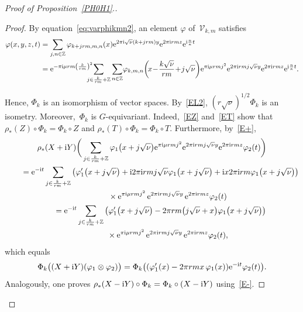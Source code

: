 \documentclass[10pt,a4paper]{amsart}
\newcommand\Z{{\mathbb Z}}
\newcommand\cV{{\mathcal V}}
\newcommand\ph{\varphi}
\numberwithin{equation}{section}
\begin{document}
\begin{proof}[Proof of Proposition~\ref{PH0H1}.]
\begin{proof}
By equation~\eqref{eq:varphikmn2}, an element $\ph$ of~$\cV_{k,m}$ satisfies
\begin{align*}
\varphi(x,y,z,t)&=\sum_{j,n\in\Z}\varphi_{k+jrm,m,n}(x){\rm e}^{2\pi {\rm i}\sqrt\nu (k+jrm)y}{\rm e}^{2\pi {\rm i}rmz}{\rm e}^{{\rm i} \frac{n}{\kappa}t}
\\
&={\rm e}^{-\pi {\rm i}\mu rm\left(\frac{k}{rm}\right)^2}\!\!\!\!\!\!\sum_{j\in\frac k{rm}+\Z}\sum_{n\in\Z}\! \varphi_{k,m,n}\bigg(\!x\!-\!\frac{k\sqrt\nu}{rm}\!+\!j\sqrt\nu\bigg){\rm e}^{\pi {\rm i}\mu rmj^2}{\rm e}^{2\pi {\rm i}rmj\sqrt\nu y}{\rm e}^{2\pi {\rm i}rmz}{\rm e}^{{\rm i} \frac{n}{\kappa}t}.
\end{align*}


 Hence, $\Phi_k$ is an isomorphism of vector spaces.
By~\eqref{EL2}, $(r\sqrt\nu)^{1/2}\Phi_k$ is an isometry.
Moreover,~$\Phi_k$ is $G$-equivariant. Indeed,~\eqref{EZ} and~\eqref{ET} show that $\rho_*(Z)\circ\Phi_k=\Phi_k\circ Z$ and $\rho_*(T)\circ\Phi_k=\Phi_k\circ T$. Furthermore, by~\eqref{E+},
\begin{gather*}
\rho_*(X+{\rm i}Y)\bigg(\sum_{j\in \frac k{rm}+\Z}
\varphi_1\big(x+j\sqrt\nu\big){\rm e}^{\pi {\rm i}\mu rmj^2}{\rm e}^{2\pi {\rm i}rmj\sqrt\nu y}{\rm e}^{2\pi {\rm i}rmz}\ph_2(t)\bigg)
\\ \qquad
{}={\rm e}^{-{\rm i}t}\sum_{j\in \frac k{rm}+\Z}\big(\varphi_1'\big(x+j\sqrt\nu\big)+{\rm i} 2\pi {\rm i}rmj\sqrt\nu\varphi_1\big(x+j\sqrt\nu\big)
+{\rm i}x2\pi {\rm i}rm\varphi_1\big(x+j\sqrt\nu\big)\big)
\\ \qquad \qquad
{}\times{\rm e}^{\pi {\rm i}\mu rmj^2}\,{\rm e}^{2\pi {\rm i}rmj\sqrt\nu y}\,{\rm e}^{2\pi {\rm i}rmz}\ph_2(t)
\\ \qquad
{}= {\rm e}^{-{\rm i}t}\sum_{j\in \frac k{rm}+\Z}\big(\varphi_1'\big(x+j\sqrt\nu\big)-2\pi rm\big(j\sqrt\nu+x\big)\varphi_1\big(x+j\sqrt\nu\big)\big)
\\ \qquad \qquad
{}\times {\rm e}^{\pi {\rm i}\mu rmj^2}\,{\rm e}^{2\pi {\rm i}rmj\sqrt\nu y}\,{\rm e}^{2\pi {\rm i}rmz}\ph_2(t),
\end{gather*}
 which equals
 \begin{gather*}
 \Phi_k\big((X+{\rm i}Y)(\ph_1\otimes\ph_2)\big)=\Phi_k\big((\ph_1'(x)-2\pi rmx\,\ph_1(x)){\rm e}^{-{\rm i}t}\ph_2(t)\big).
 \end{gather*}
 Analogously, one proves
$\rho_*(X-{\rm i}Y)\circ\Phi_k=\Phi_k\circ (X-{\rm i}Y)$ using~\eqref{E-}.
\end{proof}


\end{proof}
\end{document}
